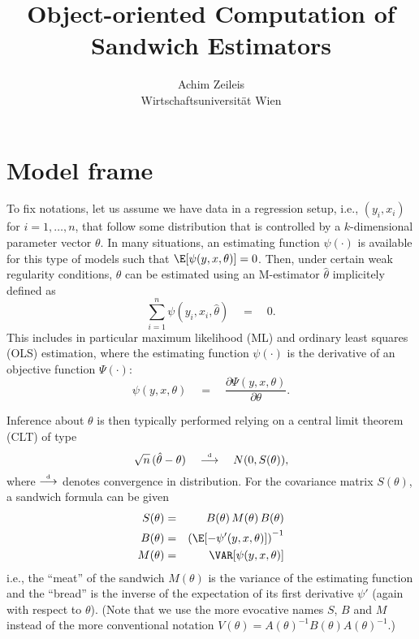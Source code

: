 \documentclass{Z}
\author{Achim Zeileis\\Wirtschaftsuniversit\"at Wien}
\title{Object-oriented Computation of Sandwich Estimators}
\newcommand{\darrow}{\stackrel{\mbox{\tiny \textnormal{d}}}{\longrightarrow}}
\begin{document}


\section{Model frame}

To fix notations, let us assume we have data in a regression setup, i.e., 
$(y_i, x_i)$ for $i = 1, \dots, n$, that follow some distribution that is 
controlled by a $k$-dimensional parameter vector $\theta$. In many situations,
an estimating function $\psi(\cdot)$ is available for this type of models
such that $\E[\psi(y, x, \theta)] = 0$. Then, under certain weak regularity
conditions, $\theta$ can be estimated using an M-estimator $\hat \theta$
implicitely defined as
  \begin{equation} \label{eq:estfun}
    \sum_{i = 1}^n \psi(y_i, x_i, \hat \theta) \quad = \quad 0.
  \end{equation}
This includes in particular maximum likelihood (ML) and ordinary least
squares (OLS) estimation, where the estimating function $\psi(\cdot)$ is
the derivative of an objective function $\Psi(\cdot)$:
  \begin{equation} \label{eq:score}
    \psi(y, x, \theta) \quad = \quad \frac{\partial \Psi(y, x, \theta)}{\partial \theta}.
  \end{equation}

Inference about $\theta$ is then typically performed relying on a central
limit theorem (CLT) of type
  \begin{equation} \label{eq:clt}
    \sqrt{n} \, (\hat \theta - \theta) \quad \darrow \quad N(0, S(\theta)),
  \end{equation}
where $\darrow$ denotes convergence in distribution. For the covariance matrix
$S(\theta)$, a sandwich formula can be given
\begin{eqnarray} \label{eq:sandwich}
  S(\theta) & = & B(\theta) \, M(\theta) \, B(\theta) \\  \label{eq:bread}
  B(\theta) & = & \left( \E[ - \psi'(y, x, \theta) ] \right)^{-1} \\  \label{eq:meat}
  M(\theta) & = & \VAR[ \psi(y, x, \theta) ]
\end{eqnarray}
i.e., the ``meat'' of the sandwich $M(\theta)$ is the variance of the estimating
function and the ``bread'' is the inverse of the expectation of its first derivative $\psi'$
(again with respect to $\theta$). (Note that we use the more evocative names $S$,
$B$ and $M$ instead of the more conventional notation $V(\theta) = A(\theta)^{-1} B(\theta)
A(\theta)^{-1}$.)
\end{document}
